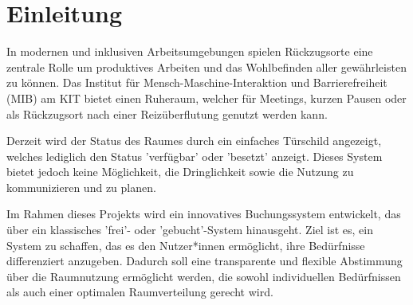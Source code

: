 \chapter{Einleitung}
In modernen und inklusiven Arbeitsumgebungen spielen Rückzugsorte eine zentrale Rolle um produktives Arbeiten und das Wohlbefinden aller gewährleisten zu können.
Das Institut für Mensch-Maschine-Interaktion und Barrierefreiheit (MIB) am KIT bietet einen Ruheraum, welcher für Meetings, kurzen Pausen oder als Rückzugsort nach einer Reizüberflutung genutzt werden kann.

Derzeit wird der Status des Raumes durch ein einfaches Türschild angezeigt, welches lediglich den Status 'verfügbar' oder 'besetzt' anzeigt.
Dieses System bietet jedoch keine Möglichkeit, die Dringlichkeit sowie die Nutzung zu kommunizieren und zu planen.

Im Rahmen dieses Projekts wird ein innovatives Buchungssystem entwickelt, das über ein klassisches 'frei'- oder 'gebucht'-System hinausgeht.
Ziel ist es, ein System zu schaffen, das es den Nutzer*innen ermöglicht, ihre Bedürfnisse differenziert anzugeben.
Dadurch soll eine transparente und flexible Abstimmung über die Raumnutzung ermöglicht werden, die sowohl individuellen Bedürfnissen als auch einer optimalen Raumverteilung gerecht wird.